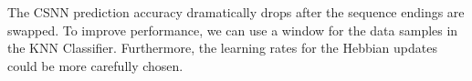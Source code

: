 \documentclass{article}
\begin{document}
The CSNN prediction accuracy dramatically drops after the sequence endings are swapped. To improve performance, we can use a window for the data samples in the KNN Classifier. Furthermore, the learning rates for the Hebbian updates could be more carefully chosen.





\newpage
\printbibliography[title={References}]
\end{document}
